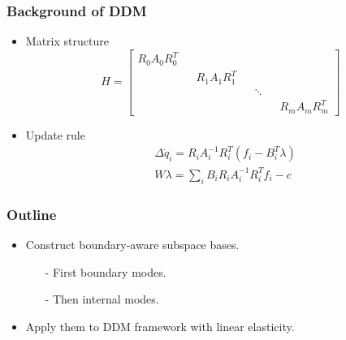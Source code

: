 \documentclass[serif,mathserif, 12pt]{beamer}
\begin{document}
\begin{frame}
  \frametitle{Background of DDM}
  \begin{itemize}
  \item Matrix structure
    \begin{equation*}
      H =
      \begin{bmatrix}
        R_0A_0R^T_0 && && && \\
        && R_1A_1R^T_1 && && \\
        && && \ddots && \\
        && && && R_mA_mR^T_m
      \end{bmatrix}
    \end{equation*}
  \item Update rule
    \begin{equation*}
      \begin{split}
        & \Delta \dot q_i = R_iA_i^{-1}R_i^T(f_i-B_i^T\lambda) \\
        & W\lambda = \sum_i B_iR_iA_i^{-1}R_i^Tf_i-c
      \end{split}
    \end{equation*}
  \end{itemize}
\end{frame}

\begin{frame}
  \frametitle{Outline}
  \begin{itemize}
  \item Construct boundary-aware subspace bases.
    \begin{itemize}
    \item[-] First boundary modes.
    \item[-] Then internal modes.
    \end{itemize}
  \item Apply them to DDM framework with linear elasticity.
  \end{itemize}
\end{frame}
\end{document}
